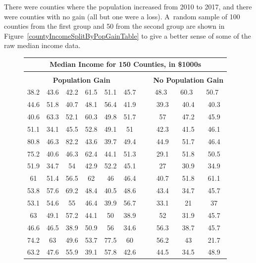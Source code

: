There were \numcountieswithgainsC{} counties where
the population increased from 2010 to 2017, and there
were \numcountieswithoutgainsC{} counties with no gain
(all but one were a loss).
A~random sample of 100 counties from the first group and
50 from the second group are shown in
Figure~\ref{countyIncomeSplitByPopGainTable}
to give a better sense of some of the raw median
income data.

\newcommand{\npgpad}[1]{\hspace{2mm}#1\hspace{1.5mm}\ }
\begin{figure}
\begin{center}
\begin{tabular}{ ccc ccc c ccc }
\multicolumn{10}{c}{\bf Median Income for 150 Counties,
    in \$1000s} \\
\hline
\vspace{-2mm} \\
\multicolumn{6}{c}{\bf Population Gain} &\hspace{5mm}\ &
    \multicolumn{3}{c}{\bf No Population Gain} \\ 
  \cline{1-6} \cline{8-10}
38.2 & 43.6 & 42.2 & 61.5 & 51.1 & 45.7 &&
    \npgpad{48.3} & \npgpad{60.3} & \npgpad{50.7} \\
44.6 & 51.8 & 40.7 & 48.1 & 56.4 & 41.9 && 39.3 & 40.4 & 40.3 \\
40.6 & 63.3 & 52.1 & 60.3 & 49.8 & 51.7 && 57 & 47.2 & 45.9 \\
51.1 & 34.1 & 45.5 & 52.8 & 49.1 & 51 && 42.3 & 41.5 & 46.1 \\
80.8 & 46.3 & 82.2 & 43.6 & 39.7 & 49.4 && 44.9 & 51.7 & 46.4 \\
75.2 & 40.6 & 46.3 & 62.4 & 44.1 & 51.3 && 29.1 & 51.8 & 50.5 \\
51.9 & 34.7 & 54 & 42.9 & 52.2 & 45.1 && 27 & 30.9 & 34.9 \\
61 & 51.4 & 56.5 & 62 & 46 & 46.4 && 40.7 & 51.8 & 61.1 \\
53.8 & 57.6 & 69.2 & 48.4 & 40.5 & 48.6 && 43.4 & 34.7 & 45.7 \\
53.1 & 54.6 & 55 & 46.4 & 39.9 & 56.7 && 33.1 & 21 & 37 \\
63 & 49.1 & 57.2 & 44.1 & 50 & 38.9 && 52 & 31.9 & 45.7 \\
46.6 & 46.5 & 38.9 & 50.9 & 56 & 34.6 && 56.3 & 38.7 & 45.7 \\
74.2 & 63 & 49.6 & 53.7 & 77.5 & 60 && 56.2 & 43 & 21.7 \\
63.2 & 47.6 & 55.9 & 39.1 & 57.8 & 42.6 && 44.5 & 34.5 & 48.9 \\

\end{tabular}
\end{center}
\end{figure}
